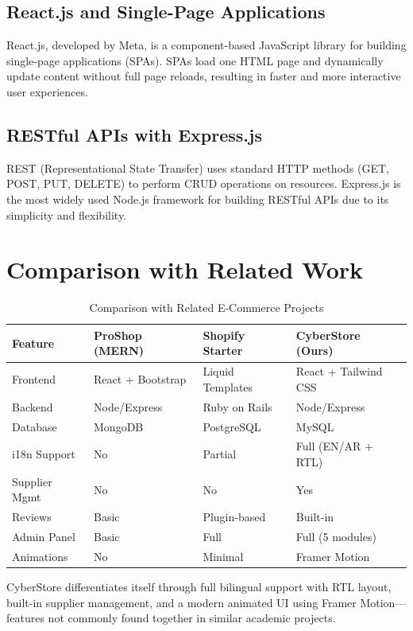 \documentclass[12pt,a4paper]{report}
\begin{document}
\subsection{React.js and Single-Page Applications}
React.js, developed by Meta, is a component-based JavaScript library for building single-page applications (SPAs). SPAs load one HTML page and dynamically update content without full page reloads, resulting in faster and more interactive user experiences.

\subsection{RESTful APIs with Express.js}
REST (Representational State Transfer) uses standard HTTP methods (GET, POST, PUT, DELETE) to perform CRUD operations on resources. Express.js is the most widely used Node.js framework for building RESTful APIs due to its simplicity and flexibility.

\section{Comparison with Related Work}

\begin{table}[H]
\centering
\caption{Comparison with Related E-Commerce Projects}
\label{tab:related}
\begin{tabularx}{\textwidth}{|p{2.5cm}|X|X|X|}
\hline
\textbf{Feature} & \textbf{ProShop (MERN)} & \textbf{Shopify Starter} & \textbf{CyberStore (Ours)} \\
\hline
Frontend & React + Bootstrap & Liquid Templates & React + Tailwind CSS \\
\hline
Backend & Node/Express & Ruby on Rails & Node/Express \\
\hline
Database & MongoDB & PostgreSQL & MySQL \\
\hline
i18n Support & No & Partial & Full (EN/AR + RTL) \\
\hline
Supplier Mgmt & No & No & Yes \\
\hline
Reviews & Basic & Plugin-based & Built-in \\
\hline
Admin Panel & Basic & Full & Full (5 modules) \\
\hline
Animations & No & Minimal & Framer Motion \\
\hline
\end{tabularx}
\end{table}

CyberStore differentiates itself through full bilingual support with RTL layout, built-in supplier management, and a modern animated UI using Framer Motion---features not commonly found together in similar academic projects.
\end{document}
